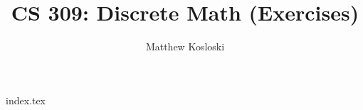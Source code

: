 \documentclass[12pt]{report}
\title{CS 309: Discrete Math (Exercises)}
\author{Matthew Kosloski}
\date{ }
\begin{document}
\maketitle
\tableofcontents
{index.tex}
\end{document}
